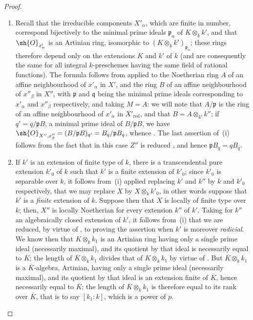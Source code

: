 \begin{proof}
\begin{enumerate}[label=(\roman*)]
  \item Recall  that the irreducible components $X'_\alpha$, which are finite in number, correspond bijectively to the minimal prime ideals $\mathfrak{p}_\alpha$ of $K\otimes_k k'$, and that $\sh{O}_{x'_\alpha}$ is an Artinian ring, isomorphic to $(K\otimes_k k')_{\mathfrak{p}_\alpha}$; these rings therefore depend only on the extensions $K$ and $k'$ of $k$ (and are consequently the same for all integral $k$-preschemes having the same field of rational functions).
The formula  follows from  applied to the Noetherian ring $A$ of an affine neighbourhood of $x'_\alpha$ in $X'$, and the ring $B$ of an affine neighbourhood of $x''_\beta$ in $X''$, with $\mathfrak{p}$ and $\mathfrak{q}$ being the minimal prime ideals corresponding to $x'_\alpha$ and $x''_\beta$ respectively, and taking $M=A$: we will note that $A/\mathfrak{p}$ is the ring of an affine neighbourhood of $x'_\alpha$ in $X'_{\mathrm{red}}$, and that $B=A\otimes_{k'} k''$; if $q'=q/\mathfrak{p}B$, a minimal prime ideal of $B/\mathfrak{p}B$, we have $\sh{O}_{X'',x''_\beta} = (B/\mathfrak{p}B)_{q'} = B_q/\mathfrak{p}B_q$, whence .
The last assertion of~(i) follows from the fact that in this case $Z''$ is reduced , and hence $\mathfrak{p}B_q = qB_q$.
  \item If $k'$ is an extension of finite type of $k$, there is a transcendental pure extension $k'_0$ of $k$ such that $k'$ is a finite extension of $k'_0$; since $k'_0$ is separable over $k$, it follows from~(i) applied replacing $k'$ and $k''$ by $k$ and $k'_0$ respectively, that we may replace $X$ by $X\otimes_k k'_0$, in other words suppose that $k'$ is a \emph{finite} extension of $k$.
Suppose then that $X$ is locally of finite type over $k$; then, $X''$ is locally Noetherian for every extension $k''$ of $k'$.
Taking for $k''$ an algebraically closed extension of $k'$, it follows from~(i) that we are reduced, by virtue of , to proving the assertion when $k'$ is moreover \emph{radicial}.
We know then that $K\otimes_k k_1$ is an Artinian ring having only a single prime ideal (necessarily maximal), and its quotient by that ideal is necessarily equal to $\overline{K}$; the length of $\overline{K}\otimes_k k_1$ divides that of $K\otimes_k k_1$ by virtue of .
But $\overline{K}\otimes_k k_1$ is a $\overline{K}$-algebra, Artinian, having only a single prime ideal (necessarily maximal), and its quotient by that ideal is an extension finite of $\overline{K}$, hence necessarily equal to $\overline{K}$; the length of $\overline{K}\otimes_k k_1$ is therefore equal to its rank over $\overline{K}$, that is to say $[k_1:k]$, which is a power of $p$.


\end{enumerate}
\end{proof}
